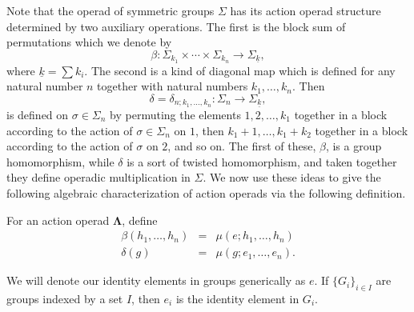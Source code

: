 \documentclass{amsbook} %
\newcommand{\mb}{\mathbf}
\numberwithin{section}{chapter}
\begin{document}
Note that the operad of symmetric groups $\Sigma$ has its action operad structure determined by two auxiliary operations.  The first is the block sum of permutations which we denote by
\[
\beta: \Sigma_{k_{1}} \times \cdots \times \Sigma_{k_{n}} \rightarrow \Sigma_{\underline{k}},
\]
where $\underline{k} = \sum k_{i}$.  The second is a kind of diagonal map which is defined for any natural number $n$ together with natural numbers $k_{1}, \ldots, k_{n}$.  Then
\[
\delta = \delta_{n; k_{1}, \ldots, k_{n}}:\Sigma_{n} \rightarrow \Sigma_{\underline{k}},
\]
is defined on $\sigma \in \Sigma_{n}$ by permuting the elements $1, 2, \ldots, k_{1}$ together in a block according to the action of $\sigma \in \Sigma_{n}$ on $1$, then $k_{1}+1, \ldots, k_{1}+k_{2}$ together in a block according to the action of $\sigma$ on $2$, and so on.  The first of these, $\beta$, is a group homomorphism, while $\delta$ is a sort of twisted homomorphism, and taken together they define operadic multiplication in $\Sigma$.  We now use these ideas to give the following algebraic characterization of action operads via the following definition.

\begin{Defi}\label{Defi:aop_bl}
For an action operad $\mb{\Lambda}$,  define
\[
\begin{array}{rcl}
\beta(h_{1}, \ldots, h_{n}) &=& \mu(e; h_{1}, \ldots, h_{n}) \\
\delta(g) &=& \mu(g; e_{1}, \ldots, e_{n}).
\end{array}
\]
\end{Defi}

\begin{nota}
We will denote our identity elements in groups generically as $e$. If $\{ G_{i} \}_{i \in I}$ are groups indexed by a set $I$, then $e_{i}$ is the identity element in $G_{i}$.
\end{nota}
\end{document}
